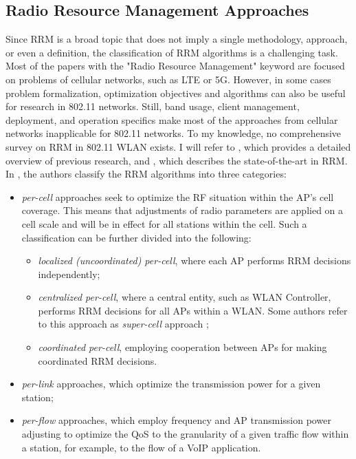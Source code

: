 \subsection {Radio Resource Management Approaches}
\label{chap:lr:sec:rrm_approaches}
Since RRM is a broad topic that does not imply a single methodology, approach, or even a definition, the classification of RRM algorithms is a challenging task. Most of the papers with the "Radio Resource Management" keyword are focused on problems of cellular networks, such as LTE or 5G. However, in some cases problem formalization, optimization objectives and algorithms can also be useful for research in 802.11 networks. Still, band usage, client management, deployment, and operation specifics make most of the approaches from cellular networks inapplicable for 802.11 networks.
To my knowledge, no comprehensive survey on RRM in 802.11 WLAN exists. I will refer to \cite{bouhafsPerFlowRadioResource2020}, which provides a detailed overview of previous research, and \cite{leeDeepLearningAidedChannel2023}, which describes the state-of-the-art in RRM.
In \cite{bouhafsPerFlowRadioResource2020}, the authors classify the RRM algorithms into three categories:
\begin{itemize}
    \item \textit{per-cell} approaches seek to optimize the RF situation within the AP's cell coverage. This means that adjustments of radio parameters are applied on a cell scale and will be in effect for all stations within the cell. Such a classification can be further divided into the following:
    \begin{itemize}
        \item \textit{localized (uncoordinated) per-cell}, where each AP performs RRM decisions independently;
        \item \textit{centralized per-cell}, where a central entity, such as WLAN Controller, performs RRM decisions for all APs within a WLAN. Some authors refer to this approach as \textit{super-cell} approach \cite{levantiCAPWAPCompliantSolutionRadio2007}; 
        \item \textit{coordinated per-cell}, employing cooperation between APs for making coordinated RRM decisions. 
    \end{itemize} 
    \item \textit{per-link} approaches, which optimize the transmission power for a given station; 
    \item \textit{per-flow} approaches, which employ frequency and AP transmission power adjusting to optimize the QoS to the granularity of a given traffic flow within a station, for example, to the flow of a VoIP application.
\end{itemize}

